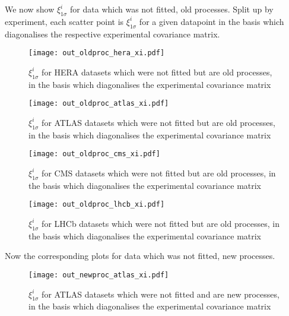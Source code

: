 

We now show $\xi_{1\sigma}^{i}$ for data which was not fitted, old processes. Split
up by experiment, each scatter point is $\xi_{1\sigma}^{i}$ for a given datapoint
in the basis which diagonalises the respective experimental covariance matrix.

\begin{figure}[!b]
    \centering
    \texttt{[image: out\_oldproc\_hera\_xi.pdf]}
    \caption{$\xi_{1\sigma}^{i}$ for HERA datasets which were not fitted
    but are old processes, in the basis which diagonalises the experimental
    covariance matrix}
    \label{fig:outoldheraxi}
\end{figure}

\begin{figure}[h]
    \centering
    \texttt{[image: out\_oldproc\_atlas\_xi.pdf]}
    \caption{$\xi_{1\sigma}^{i}$ for ATLAS datasets which were not fitted
    but are old processes, in the basis which diagonalises the experimental
    covariance matrix}
    \label{fig:outoldatlasxi}
\end{figure}

\begin{figure}[h]
    \centering
    \texttt{[image: out\_oldproc\_cms\_xi.pdf]}
    \caption{$\xi_{1\sigma}^{i}$ for CMS datasets which were not fitted
    but are old processes, in the basis which diagonalises the experimental
    covariance matrix}
    \label{fig:outoldcmsxi}
\end{figure}

\begin{figure}[h]
    \centering
    \texttt{[image: out\_oldproc\_lhcb\_xi.pdf]}
    \caption{$\xi_{1\sigma}^{i}$ for LHCb datasets which were not fitted
    but are old processes, in the basis which diagonalises the experimental
    covariance matrix}
    \label{fig:outoldlhcbxi}
\end{figure}

Now the corresponding plots for data which was not fitted, new processes.

\begin{figure}[h]
    \centering
    \texttt{[image: out\_newproc\_atlas\_xi.pdf]}
    \caption{$\xi_{1\sigma}^{i}$ for ATLAS datasets which were not fitted
    and are new processes, in the basis which diagonalises the experimental
    covariance matrix}
    \label{fig:outnewatlasxi}
\end{figure}

